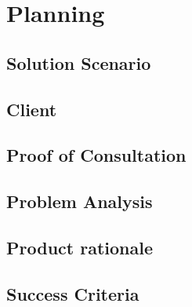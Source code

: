 \chapter{Planning}
\section{Solution Scenario}
\section{Client}
\section{Proof of Consultation}
\section{Problem Analysis}
\section{Product rationale}
\section{Success Criteria}

